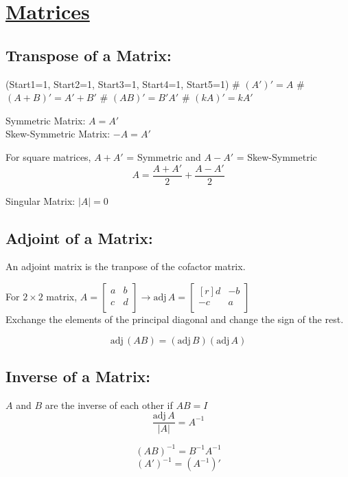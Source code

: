 \documentclass[Math.tex]{subfiles}
\begin{document}
\section*{\centering\huge\underline{Matrices}}

\subsection*{Transpose of a Matrix:}
\begin{easylist}
\ListProperties(Start1=1, Start2=1, Start3=1, Start4=1, Start5=1)	
	# $(A')' = A$
	# $(A+B)' = A' + B'$
	# $(AB)' = B'A'$
	# $(kA)' = kA'$
\end{easylist}

Symmetric Matrix: $A = A'$\\
Skew-Symmetric Matrix: $-A = A'$

For square matrices, $A + A'$ = Symmetric and $A - A'$ = Skew-Symmetric
\[A = \frac{A + A'}{2} + \frac{A-A'}{2}\]

Singular Matrix: $|A| = 0$


\subsection*{Adjoint of a Matrix:}
An adjoint matrix is the tranpose of the cofactor matrix.

For $2\times 2$ matrix, 
$A = 	\begin{bmatrix}
			a & b\\
			c & d\\
		\end{bmatrix}\to 
\mathrm{adj}\, A = 	\begin{bmatrix*}[r]
				d & -b\\
				-c & a\\
			\end{bmatrix*}$\\
Exchange the elements of the principal diagonal and change the sign of the rest.

\[\mathrm{adj}\,(AB) = (\mathrm{adj}\,B)(\mathrm{adj}\,A)\]

\subsection*{Inverse of a Matrix:}
$A$ and $B$ are the inverse of each other if $AB = I$
\[\frac{\mathrm{adj}\, A}{|A|} = A^{-1}\]

\[(AB)^{-1} = B^{-1}A^{-1}\]
\[(A')^{-1} = (A^{-1})'\]

\pagebreak
\end{document}
